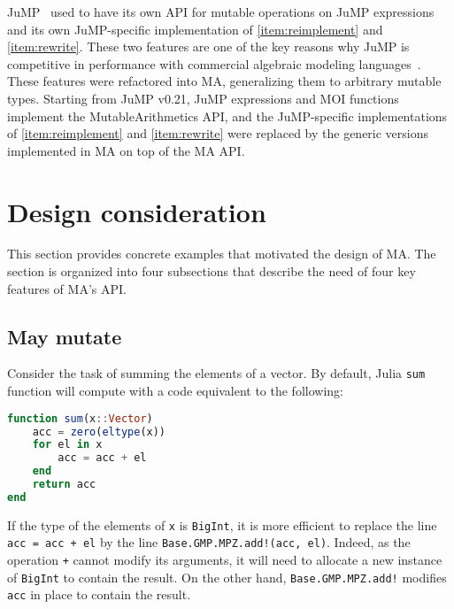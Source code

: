 \documentclass{juliacon}
\begin{document}
JuMP~\cite{dunning2017jump} used to have its own API for mutable operations on JuMP expressions and
its own JuMP-specific implementation of \ref{item:reimplement} and \ref{item:rewrite}.
These two features are one of the key reasons why JuMP is competitive in performance with commercial algebraic modeling languages~\cite[Section~3--4]{dunning2017jump}.
These features were refactored into MA, generalizing them to arbitrary mutable types.
Starting from JuMP v0.21, JuMP expressions and MOI functions implement the MutableArithmetics API, and
the JuMP-specific implementations of \ref{item:reimplement} and \ref{item:rewrite} were replaced by the generic versions implemented in MA on top of the MA API.

\section{Design consideration}
This section provides concrete examples that motivated the design of MA.
The section is organized into four subsections that describe the need of four key features of MA's API.

\subsection{May mutate}
Consider the task of summing the elements of a vector.
By default, Julia \texttt{sum} function will compute with a code equivalent to the following:
\begin{lstlisting}[language = Julia]
function sum(x::Vector)
    acc = zero(eltype(x))
    for el in x
        acc = acc + el
    end
    return acc
end
\end{lstlisting}
If the type of the elements of \texttt{x} is \texttt{BigInt}, it is more efficient to replace the line
\lstinline|acc = acc + el| by the line
\lstinline|Base.GMP.MPZ.add!(acc, el)|.
Indeed, as the operation \lstinline|+| cannot modify its arguments,
it will need to allocate a new instance of \texttt{BigInt} to contain the result.
On the other hand, \lstinline|Base.GMP.MPZ.add!| modifies \lstinline|acc| in place to contain the result.
\end{document}
